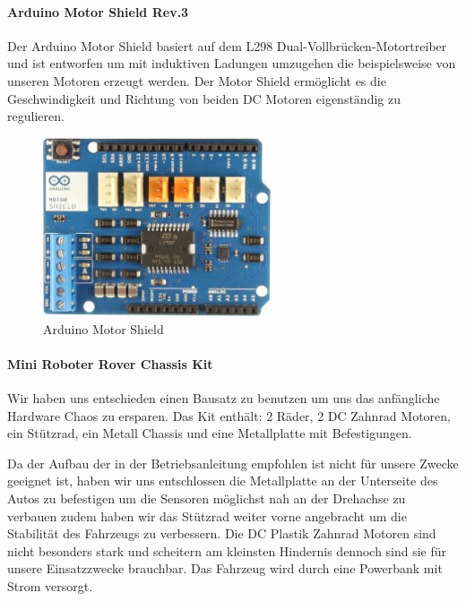 \documentclass[12pt]{article}
\begin{document}
\paragraph{Arduino Motor Shield Rev.3} Der Arduino Motor Shield basiert auf dem L298 Dual-Vollbrücken-Motortreiber und ist entworfen um mit induktiven Ladungen umzugehen die beispielsweise von unseren Motoren erzeugt werden. Der Motor Shield ermöglicht es die Geschwindigkeit und Richtung von beiden DC Motoren eigenständig zu regulieren.

\vspace{0.5cm}
\begin{figure}[thb]
\includegraphics[width=0.6\textwidth]{images/MotorShield_Front.jpg}\par
\caption{Arduino Motor Shield \cite{motorShield-front}}
\end{figure}

\paragraph{Mini Roboter Rover Chassis Kit} Wir haben uns entschieden einen Bausatz zu benutzen um uns das anfängliche Hardware Chaos zu ersparen. Das Kit enthält: 2 Räder, 2 DC Zahnrad Motoren, ein Stützrad, ein Metall Chassis und eine Metallplatte mit Befestigungen.

Da der Aufbau der in der Betriebsanleitung empfohlen ist nicht für unsere Zwecke geeignet ist, haben wir uns entschlossen die Metallplatte an der Unterseite des Autos zu befestigen um die Sensoren möglichst nah an der Drehachse zu verbauen zudem haben wir das Stützrad weiter vorne angebracht um die Stabilität des Fahrzeugs zu verbessern. Die DC Plastik Zahnrad Motoren sind nicht besonders stark und scheitern am kleinsten Hindernis dennoch sind sie für unsere Einsatzzwecke brauchbar. Das Fahrzeug wird durch eine Powerbank mit Strom versorgt.

\vspace{0.5cm}
\end{document}
